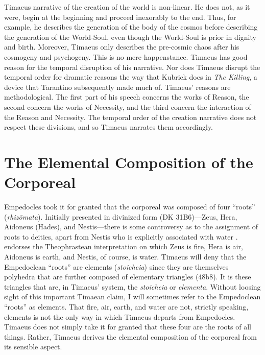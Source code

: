 Timaeus narrative of the creation of the world is non-linear. He does not, as it were, begin at the beginning and proceed inexorably to the end. Thus, for example, he describes the generation of the body of the cosmos before describing the generation of the World-Soul, even though the World-Soul is prior in dignity and birth. Moreover, Timaeus only describes the pre-cosmic chaos after his cosmogeny and psychogeny. This is no mere happenstance. Timaeus has good reason for the temporal disruption of his narrative. Nor does Timaeus disrupt the temporal order for dramatic reasons the way that Kubrick does in \emph{The Killing}, a device that Tarantino subsequently made much of. Timaeus' reasons are methodological. The first part of his speech concerns the works of Reason, the second concern the works of Necessity, and the third concern the interaction of the Reason and Necessity. The temporal order of the creation narrative does not respect these divisions, and so Timaeus narrates them accordingly.



\section{The Elemental Composition of the Corporeal} %
\label{sec:the_elemental_composition_of_the_corporeal}

Empedocles took it for granted that the corporeal was composed of four ``roots'' (\emph{rhi\-zō\-ma\-ta}). Initially presented in divinized form (DK 31B6)---Zeus, Hera, Aidoneus (Hades), and Nestis---there is some controversy as to the assignment of roots to deities, apart from Nestis who is explicitly associated with water \citep[165--6]{Wright:1981zr}. \citet[165]{Wright:1981zr} endorses the Theophrastean interpretation on which Zeus is fire, Hera is air, Aidon\-eus is earth, and Nestis, of course, is water. Timaeus will deny that the Empedoclean ``roots'' are elements (\emph{stoicheia}) since they are themselves polyhedra that are further composed of elementary triangles (48b8). It is these triangles that are, in Timaeus' system, the \emph{stoicheia} or \emph{elementa}. Without loosing sight of this important Timaean claim, I will sometimes refer to the Empedoclean ``roots'' as elements. That fire, air, earth, and water are not, strictly speaking, elements is not the only way in which Timaeus departs from Empedocles. Timaeus does not simply take it for granted that these four are the roots of all things. Rather, Timaeus derives the elemental composition of the corporeal from its sensible aspect.

